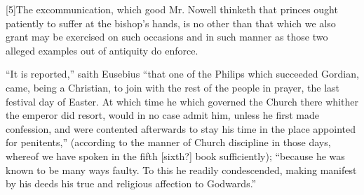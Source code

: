 [5]The excommunication, which good Mr. Nowell thinketh that princes ought patiently to suffer at the bishop’s hands, is no other than that which we also grant may be exercised on such occasions and in such manner as those two alleged examples out of antiquity do enforce.

“It is reported,” saith Eusebius “that one of the Philips which succeeded Gordian, came, being a Christian, to join with the rest of the people in prayer, the last festival day of Easter. At which time he which governed the Church there whither the emperor did resort, would in no case admit him, unless he first made confession, and were contented afterwards to stay his time in the place appointed for penitents,” (according to the manner of Church discipline in those days, whereof we have spoken in the fifth [sixth?] book sufficiently); “because he was known to be many ways faulty. To this he readily condescended, making manifest by his deeds his true and religious affection to Godwards.”

